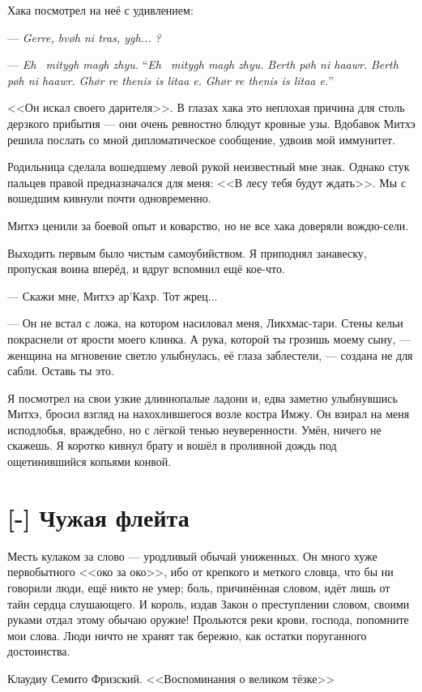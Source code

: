 Хака посмотрел на неё с удивлением:

--- \textit{Gerre, bv\o{}h ni tras, ygh... \Seli?}

{--- \textit{Eh \Seli\ mitygh magh zhyu.}}
{``\textit{Eh \Seli\ mitygh magh zhyu.}}
{\textit{Berth p\o{}h ni haawr.}}
{\textit{Berth p\o{}h ni haawr.}}
{\textit{Gh\o{}r re thenis is litaa e.}}
{\textit{Gh\o{}r re thenis is litaa e.}''}

<<Он искал своего дарителя>>.
В глазах хака это неплохая причина для столь дерзкого прибытия --- они очень ревностно блюдут кровные узы.
Вдобавок Митхэ решила послать со мной дипломатическое сообщение, удвоив мой иммунитет.

Родильница сделала вошедшему левой рукой неизвестный мне знак.
Однако стук пальцев правой предназначался для меня: <<В лесу тебя будут ждать>>.
Мы с вошедшим кивнули почти одновременно.

Митхэ ценили за боевой опыт и коварство, но не все хака доверяли вождю-сели.

Выходить первым было чистым самоубийством.
Я приподнял занавеску, пропуская воина вперёд, и вдруг вспомнил ещё кое-что.

--- Скажи мне, Митхэ ар’Кахр.
Тот жрец...

--- Он не встал с ложа, на котором насиловал меня, Ликхмас-тари.
Стены кельи покраснели от ярости моего клинка.
А рука, которой ты грозишь моему сыну, --- женщина на мгновение светло улыбнулась, её глаза заблестели, --- создана не для сабли.
Оставь ты это.

Я посмотрел на свои узкие длиннопалые ладони и, едва заметно улыбнувшись Митхэ, бросил взгляд на нахохлившегося возле костра Имжу.
Он взирал на меня исподлобья, враждебно, но с лёгкой тенью неуверенности.
Умён, ничего не скажешь.
Я коротко кивнул брату и вошёл в проливной дождь под ощетинившийся копьями конвой.

\section{[-] Чужая флейта}

\epigraph
{Месть кулаком за слово --- уродливый обычай униженных.
Он много хуже первобытного <<око за око>>, ибо от крепкого и меткого словца, что бы ни говорили люди, ещё никто не умер;
боль, причинённая словом, идёт лишь от тайн сердца слушающего.
И король, издав Закон о преступлении словом, своими руками отдал этому обычаю оружие!
Прольются реки крови, господа, попомните мои слова.
Люди ничто не хранят так бережно, как остатки поруганного достоинства.}
{Клаудиу Семито Фризский.
<<Воспоминания о великом тёзке>>}

